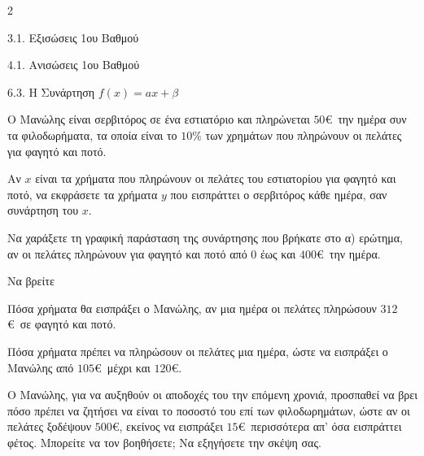 \begin{ylh}{2}
    \item 3.1. Εξισώσεις 1ου Βαθμού
    \item 4.1. Ανισώσεις 1ου Βαθμού
    \item 6.3. Η Συνάρτηση $f(x)=ax+\beta$
\end{ylh}

Ο Μανώλης είναι σερβιτόρος σε ένα εστιατόριο και πληρώνεται $50$\euro\ την ημέρα συν τα φιλοδωρήματα, τα οποία είναι το $10\%$ των χρημάτων που πληρώνουν οι πελάτες για φαγητό και ποτό.

\begin{alist}
\item Αν $x$ είναι τα χρήματα που πληρώνουν οι πελάτες του εστιατορίου για φαγητό και ποτό, να εκφράσετε τα χρήματα $y$ που εισπράττει ο σερβιτόρος κάθε ημέρα, σαν συνάρτηση του $x$.
\item Να χαράξετε τη γραφική παράσταση της συνάρτησης που βρήκατε στο α) ερώτημα, αν οι πελάτες πληρώνουν για φαγητό και ποτό από $0$ έως και $400$\euro\ την ημέρα.
\begin{center}

\end{center}

\item Να βρείτε

\begin{rlist}
\item Πόσα χρήματα θα εισπράξει ο Μανώλης, αν μια ημέρα οι πελάτες πληρώσουν $312$\euro\ σε φαγητό και ποτό.
\item Πόσα χρήματα πρέπει να πληρώσουν οι πελάτες μια ημέρα, ώστε να εισπράξει ο Μανώλης από $105$\euro\ μέχρι και $120$\euro.
\end{rlist}
\item Ο Μανώλης, για να αυξηθούν οι αποδοχές του την επόμενη χρονιά, προσπαθεί να βρει πόσο πρέπει να ζητήσει να είναι το ποσοστό του επί των φιλοδωρημάτων, ώστε αν οι πελάτες ξοδέψουν $500$\euro, εκείνος να εισπράξει $15$\euro\ περισσότερα απ' όσα εισπράττει φέτος. Μπορείτε να τον βοηθήσετε; Να εξηγήσετε την σκέψη σας.
\end{alist}

